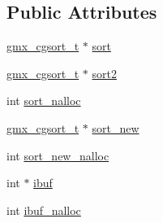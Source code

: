 \subsection*{\-Public \-Attributes}
\begin{DoxyCompactItemize}
\item 
\hyperlink{structgmx__cgsort__t}{gmx\-\_\-cgsort\-\_\-t} $\ast$ \hyperlink{structgmx__domdec__sort__t_a551740f7e03a440897a5fb36d27cd3e3}{sort}
\item 
\hyperlink{structgmx__cgsort__t}{gmx\-\_\-cgsort\-\_\-t} $\ast$ \hyperlink{structgmx__domdec__sort__t_a98a305b8bfb53addd1f1539e5553dd24}{sort2}
\item 
int \hyperlink{structgmx__domdec__sort__t_a2b46ff0dd67a702563a68fc772e5d0ae}{sort\-\_\-nalloc}
\item 
\hyperlink{structgmx__cgsort__t}{gmx\-\_\-cgsort\-\_\-t} $\ast$ \hyperlink{structgmx__domdec__sort__t_aea24f9be038e12313854dbf364450a40}{sort\-\_\-new}
\item 
int \hyperlink{structgmx__domdec__sort__t_a32b8b1b9305295d8d6317caf5477d46a}{sort\-\_\-new\-\_\-nalloc}
\item 
int $\ast$ \hyperlink{structgmx__domdec__sort__t_a7a641a1cb01c334ef2d206206f778662}{ibuf}
\item 
int \hyperlink{structgmx__domdec__sort__t_a38639a31420b1fa21f1711ce4f3382d2}{ibuf\-\_\-nalloc}
\end{DoxyCompactItemize}


